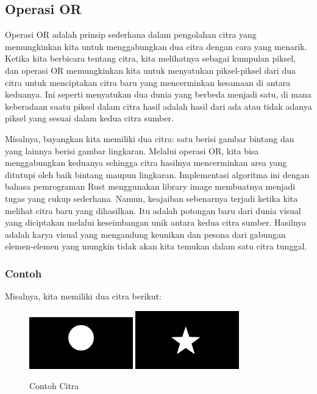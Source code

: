 \documentclass[a4paper,12pt,openany]{book}
\begin{document}
\subsection{Operasi OR}


Operasi OR adalah prinsip sederhana dalam pengolahan citra yang memungkinkan kita untuk menggabungkan dua citra dengan cara yang menarik. Ketika kita berbicara tentang citra, kita melihatnya sebagai kumpulan piksel, dan operasi OR memungkinkan kita untuk menyatukan piksel-piksel dari dua citra untuk menciptakan citra baru yang mencerminkan kesamaan di antara keduanya. Ini seperti menyatukan dua dunia yang berbeda menjadi satu, di mana keberadaan suatu piksel dalam citra hasil adalah hasil dari ada atau tidak adanya piksel yang sesuai dalam kedua citra sumber.

Misalnya, bayangkan kita memiliki dua citra: satu berisi gambar bintang dan yang lainnya berisi gambar lingkaran. Melalui operasi OR, kita bisa menggabungkan keduanya sehingga citra hasilnya mencerminkan area yang ditutupi oleh baik bintang maupun lingkaran. Implementasi algoritma ini dengan bahasa pemrograman Rust menggunakan library image membuatnya menjadi tugas yang cukup sederhana. Namun, keajaiban sebenarnya terjadi ketika kita melihat citra baru yang dihasilkan. Itu adalah potongan baru dari dunia visual yang diciptakan melalui keseimbangan unik antara kedua citra sumber. Hasilnya adalah karya visual yang mengandung keunikan dan pesona dari gabungan elemen-elemen yang mungkin tidak akan kita temukan dalam satu citra tunggal.

\subsubsection{Contoh}
Misalnya, kita memiliki dua citra berikut:
\begin{figure}[H]
    \centering
    \includegraphics[width=0.4\textwidth]{./image/boolean/circle.png}
    \includegraphics[width=0.4\textwidth]{./image/boolean/star-1.jpg}
    \caption{Contoh Citra}
\end{figure}
\end{document}

